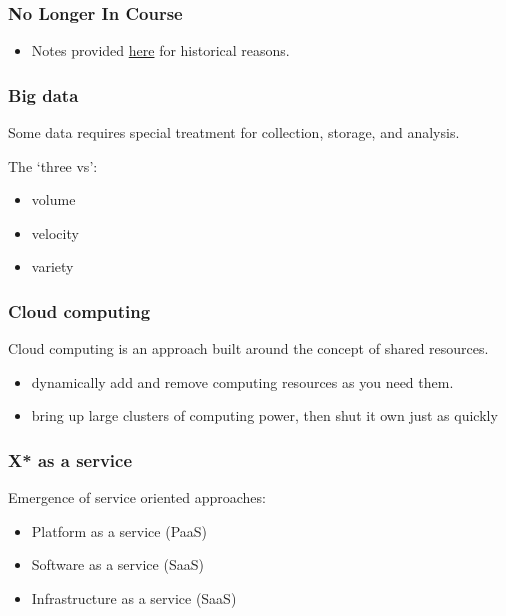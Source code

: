 \subsubsection{No Longer In Course}\label{no-longer-in-course-2}

\begin{itemize}
\itemsep1pt\parskip0pt
\item
  Notes provided \href{sec01cloud}{here} for historical reasons.
\end{itemize}

\subsubsection{Big data}\label{big-data}

Some data requires special treatment for collection, storage, and
analysis.

The `three vs':

\begin{itemize}
\itemsep1pt\parskip0pt
\item
  volume
\item
  velocity
\item
  variety
\end{itemize}

\subsubsection{Cloud computing}\label{cloud-computing}

Cloud computing is an approach built around the concept of shared
resources.

\begin{itemize}
\itemsep1pt\parskip0pt
\item
  dynamically add and remove computing resources as you need them.
\item
  bring up large clusters of computing power, then shut it own just as
  quickly
\end{itemize}

\subsubsection{X* as a service}\label{x-as-a-service}

Emergence of service oriented approaches:

\begin{itemize}
\itemsep1pt\parskip0pt
\item
  Platform as a service (PaaS)
\item
  Software as a service (SaaS)
\item
  Infrastructure as a service (SaaS)
\end{itemize}

